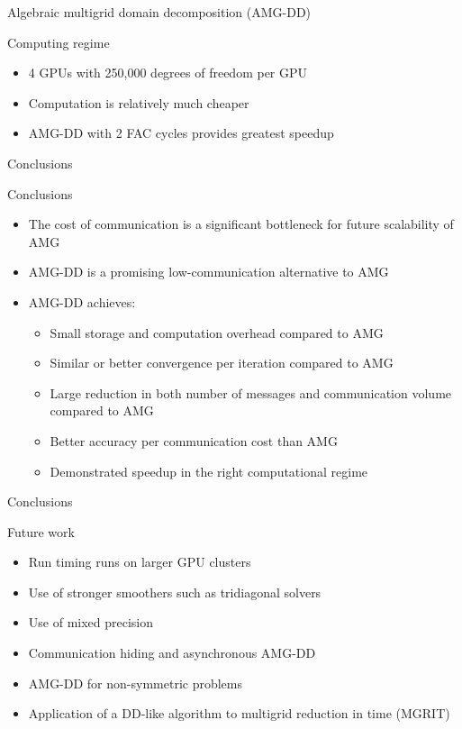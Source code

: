 \documentclass[18pt,xcolor=table]{beamer}
\begin{document}
\begin{frame}{Algebraic multigrid domain decomposition (AMG-DD)}
\begin{block}{Computing regime}
\begin{itemize}
\item 4 GPUs with 250,000 degrees of freedom per GPU
   \item Computation is relatively much cheaper
   \item AMG-DD with 2 FAC cycles provides greatest speedup
\end{itemize}
\end{block}

\centering
\vspace{0.5 cm}

\end{frame}


\begin{frame}{Conclusions}
\begin{block}{Conclusions}
\begin{itemize}
\item The cost of communication is a significant bottleneck for future scalability of AMG
\item AMG-DD is a promising low-communication alternative to AMG
\item AMG-DD achieves:
\begin{itemize}
\item Small storage and computation overhead compared to AMG
\item Similar or better convergence per iteration compared to AMG
\item Large reduction in both number of messages and communication volume compared to AMG
\item Better accuracy per communication cost than AMG
\item Demonstrated speedup in the right computational regime
\end{itemize}
\end{itemize}
\end{block}
\end{frame}

\begin{frame}{Conclusions}
\begin{block}{Future work}
\begin{itemize}
\item Run timing runs on larger GPU clusters
\item Use of stronger smoothers such as tridiagonal solvers
\item Use of mixed precision
\item Communication hiding and asynchronous AMG-DD
\item AMG-DD for non-symmetric problems
\item Application of a DD-like algorithm to multigrid reduction in time (MGRIT)
\end{itemize}
\end{block}

\end{frame}


\end{document}
